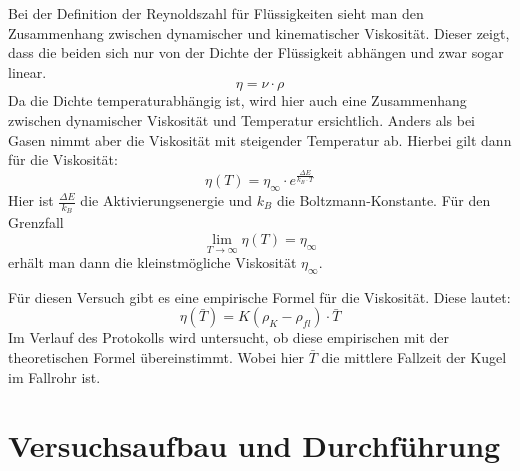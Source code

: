 \documentclass[fontsize=12pt]{scrartcl}
\begin{document}
Bei der Definition der Reynoldszahl für Flüssigkeiten sieht man den Zusammenhang zwischen dynamischer und kinematischer Viskosität. Dieser zeigt, dass die beiden sich nur von der Dichte der Flüssigkeit abhängen und zwar sogar linear.
\begin{equation*}
\eta = \nu \cdot \rho
\end{equation*}
Da die Dichte temperaturabhängig ist, wird hier auch eine Zusammenhang zwischen dynamischer Viskosität und Temperatur ersichtlich. Anders als bei Gasen nimmt aber die Viskosität mit steigender Temperatur ab. Hierbei gilt dann für die Viskosität:
\begin{equation*}
\eta(T)=\eta_{\infty}\cdot e^{\frac{\Delta E}{k_B \cdot T}}
\end{equation*}
Hier ist $\frac{\Delta E}{k_B}$ die Aktivierungsenergie und $k_B$ die Boltzmann-Konstante. Für den Grenzfall 
\begin{equation*}
\lim\limits_{T \rightarrow \infty} \eta(T)	 = \eta_{\infty}
\end{equation*}
erhält man dann die kleinstmögliche Viskosität $\eta_{\infty}$.\par

Für diesen Versuch gibt es eine empirische Formel für die Viskosität. Diese lautet:
\begin{equation*}
\eta(\bar{T})=K(\rho_K-\rho_{fl})\cdot\bar{T}
\end{equation*}
Im Verlauf des Protokolls wird untersucht, ob diese empirischen mit der theoretischen Formel übereinstimmt. Wobei hier $\bar{T}$ die mittlere Fallzeit der Kugel im Fallrohr ist.
\newpage

\section{Versuchsaufbau und Durchführung}
\end{document}
